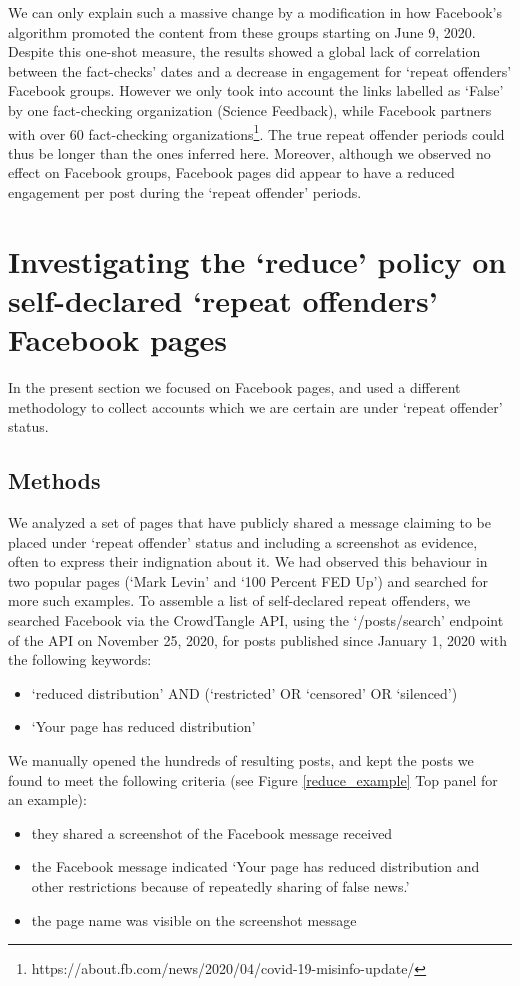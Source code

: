 \documentclass[11pt,a4paper]{article}
\begin{document}
We can only explain such a massive change by a modification in how Facebook’s algorithm promoted the content from these groups starting on June 9, 2020.
Despite this one-shot measure, the results showed a global lack of correlation between the fact-checks' dates and a decrease in engagement for `repeat offenders' Facebook groups.
However we only took into account the links labelled as `False' by one fact-checking organization (Science Feedback), while Facebook partners with over 60 fact-checking organizations\footnote{https://about.fb.com/news/2020/04/covid-19-misinfo-update/}.
The true repeat offender periods could thus be longer than the ones inferred here.
Moreover, although we observed no effect on Facebook groups, Facebook pages did appear to have a reduced engagement per post during the `repeat offender' periods.

\section{Investigating the `reduce' policy on self-declared `repeat offenders' Facebook pages}

In the present section we focused on Facebook pages, and used a different methodology to collect accounts which we are certain are under `repeat offender' status. 

\subsection{Methods}

We analyzed a set of pages that have publicly shared a message claiming to be placed under `repeat offender' status and including a screenshot as evidence, often to express their indignation about it. 
We had observed this behaviour in two popular pages (`Mark Levin' and `100 Percent FED Up') and searched for more such examples. 
To assemble a list of self-declared repeat offenders, we searched Facebook via the CrowdTangle API, using the `/posts/search' endpoint of the API on November 25, 2020, for posts published since January 1, 2020 with the following keywords:
\begin{itemize}
\item `reduced distribution' AND (`restricted' OR `censored' OR `silenced')
\item `Your page has reduced distribution'
\end{itemize}

We manually opened the hundreds of resulting posts, and kept the posts we found to meet the following criteria (see Figure \ref{reduce_example} Top panel for an example):
\begin{itemize}
\item they shared a screenshot of the Facebook message received
\item the Facebook message indicated `Your page has reduced distribution and other restrictions because of repeatedly sharing of false news.'
\item the page name was visible on the screenshot message
\end{itemize}
\end{document}
